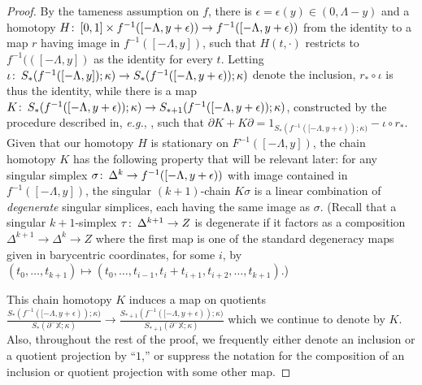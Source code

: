 \documentclass[11pt]{amsart}
\theoremstyle{definition}
\theoremstyle{remark}
\numberwithin{equation}{section}
\def\co{\colon\thinspace}
\def\ep{\epsilon}
\begin{document}
\begin{proof}
	By the tameness assumption on $f$, there is $\ep=\ep(y)\in(0,\Lambda-y)$ and a homotopy $H\co [0,1]\times f^{-1}([-\Lambda,y+\ep))\to f^{-1}([-\Lambda,y+\ep))$  from the identity to a map $r$ having image in $f^{-1}([-\Lambda,y])$, such that $H(t,\cdot)$ restricts to  $f^{-1}(([-\Lambda,y])$ as the identity for every $t$.  Letting $\iota\co S_*(f^{-1}([-\Lambda,y]);\kappa)\to S_*(f^{-1}([-\Lambda,y+\ep));\kappa)$ denote the inclusion, $r_*\circ\iota$ is thus the identity, while there is a map $K\co S_*(f^{-1}([-\Lambda,y+\ep));\kappa)\to S_{*+1}(f^{-1}([-\Lambda,y+\ep));\kappa)$, constructed by the procedure described in, \emph{e.g.}, \cite[p. 112]{Ha}, such that $\partial K+K\partial=1_{S_*(f^{-1}([-\Lambda,y+\ep));\kappa)}-\iota\circ r_*$. Given that our homotopy $H$ is stationary on  $F^{-1}([-\Lambda,y])$, the chain homotopy $K$ has the following property that will be relevant later: for any singular simplex $\sigma\co \Delta^k\to f^{-1}([-\Lambda,y+\ep))$ with image contained in $f^{-1}([-\Lambda,y])$, the singular $(k+1)$-chain $K\sigma$ is a linear combination of \emph{degenerate} singular simplices, each having the same image as $\sigma$.  (Recall that a singular $k+1$-simplex $\tau\co \Delta^{k+1}\to Z$ is degenerate if it factors as a composition $\Delta^{k+1}\to\Delta^k\to Z$ where the first map is one of the standard degeneracy maps given in barycentric coordinates, for some $i$, by $(t_0,\ldots,t_{k+1})\mapsto(t_0,\ldots,t_{i-1},t_i+t_{i+1},t_{i+2},\ldots,t_{k+1})$.) 
	
	This chain homotopy $K$ induces a map on quotients $\frac{S_*(f^{-1}([-\Lambda,y+\ep));\kappa)}{S_*(\partial^-\mathbb{X};\kappa)}\to \frac{S_{*+1}(f^{-1}([-\Lambda,y+\ep));\kappa)}{S_{*+1}(\partial^-\mathbb{X};\kappa)}$ which we continue to denote by $K$.
	Also, 
	throughout the rest of the proof, we frequently either denote an inclusion or a quotient projection by ``$1$,'' or suppress the notation for the composition of an inclusion or quotient projection with some other map.
	

\end{proof}
\end{document}

